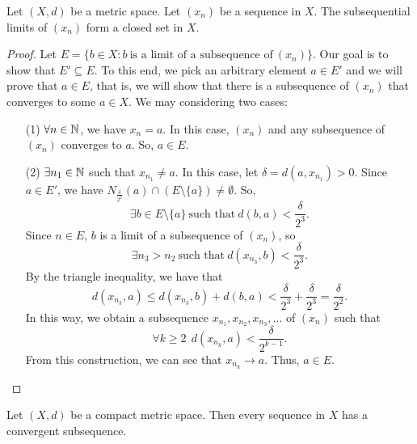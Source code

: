 \documentclass[a4paper]{book}
\begin{document}
\begin{theorem}[ ]
    Let \( (X,d) \) be a metric space. Let \( ({x}_{n}) \) be a sequence in \( X  \). The subsequential limits of \( ({x}_{n}) \) form a closed set in \( X  \).
\end{theorem}

\begin{proof}
    Let \( E = \{ b \in X : b \ \text{is a limit of a subsequence of} \ ({x}_{n}) \}  \). Our goal is to show that \( E' \subseteq E  \). To this end, we pick an arbitrary element \( a \in E' \) and we will prove that \( a \in E  \), that is, we will show that there is a subsequence of \( ({x}_{n}) \) that converges to some \( a \in X  \). We may considering two cases:
    \begin{enumerate}
        \item[(1)] \( \forall n \in \mathbb{N} \), we have \( {x}_{n} = a  \). In this case, \( ({x}_{n}) \) and any subsequence of \( ({x}_{n}) \) converges to \( a  \). So, \( a \in E  \).
        \item[(2)] \( \exists {n}_{1} \in \mathbb{N}  \) such that \( {x}_{{n}_{1}} \neq a  \). In this case, let \( \delta = d(a, {x}_{{n}_{1}}) > 0  \). Since \( a \in E' \), we have \( {N}_{\frac{ \delta }{ 2^{2} } }(a) \cap (E \setminus  \{ a \} ) \neq \emptyset \). So,  
            \[  \exists b \in E \setminus  \{ a \}  \ \text{such that} \ d(b,a) < \frac{ \delta }{ 2^{3} }. \]
            Since \( n \in E  \), \( b  \) is a limit of a subsequence of \( ({x}_{n}) \), so
            \[  \exists {n}_{3} > {n}_{2} \ \text{such that} \ d({x}_{{n}_{3}}, b) < \frac{ \delta }{ 2^{3} }. \]
            By the triangle inequality, we have that 
            \[  d({x}_{{n}_{3}}, a) \leq d({x}_{{n}_{3}}, b) + d(b,a) < \frac{ \delta }{ 2^{3} }  + \frac{ \delta }{ 2^{3} }  = \frac{ \delta }{ 2^{2} }. \]
            In this way, we obtain a subsequence \( {x}_{{n}_{1}}, {x}_{{n}_{2}}, {x}_{{n}_{3}}, \dots  \) of \( ({x}_{n}) \) such that
            \[  \forall k \geq 2 \ \ d({x}_{{n}_{k }} , a) < \frac{ \delta }{ 2^{k-1} }. \]
           From this construction, we can see that \( {x}_{{n}_{k }} \to a  \). Thus, \( a \in E  \). 
    \end{enumerate}
\end{proof}

\begin{theorem}\label{SeqCompact}
   Let \( (X,d) \) be a compact metric space. Then every sequence in \( X  \) has a convergent subsequence. 
\end{theorem}
\end{document}
